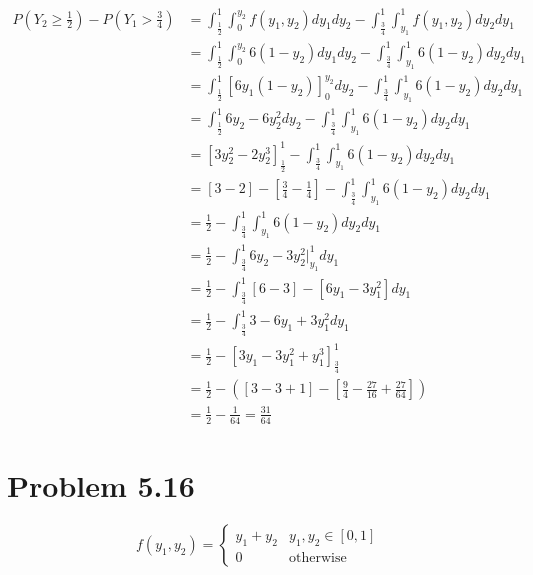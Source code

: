 \documentclass{article}
\theoremstyle{definition}
\begin{document}
        \begin{align*}
            P(Y_2 \geqslant \frac{1}{2}) - P(Y_1 > \frac{3}{4})
            &= \int_\frac{1}{2}^1 \int_0^{y_2} f(y_1,y_2) dy_1 dy_2 - 
               \int_\frac{3}{4}^1 \int_{y_1}^1 f(y_1,y_2) dy_2 dy_1 \\
            &= \int_\frac{1}{2}^1 \int_0^{y_2} 6(1 - y_2) dy_1 dy_2 - 
               \int_\frac{3}{4}^1 \int_{y_1}^1 6(1 - y_2) dy_2 dy_1 \\
            &= \int_{\frac{1}{2}}^1 \left[6y_1(1 - y_2)\right]_0^{y_2} dy_2 -
               \int_{\frac{3}{4}}^1 \int_{y_1}^1 6(1 - y_2) dy_2 dy_1 \\
            &= \int_\frac{1}{2}^1 6y_2 - 6y_2^2 dy_2 - 
               \int_{\frac{3}{4}}^1 \int_{y_1}^1 6(1 - y_2) dy_2 dy_1 \\
            &= \left[ 3y_2^2 - 2y_2^3 \right]_\frac{1}{2}^1 - 
               \int_{\frac{3}{4}}^1 \int_{y_1}^1 6(1 - y_2) dy_2 dy_1 \\
            &= [3 - 2] - [\frac{3}{4} - \frac{1}{4}] - 
               \int_{\frac{3}{4}}^1 \int_{y_1}^1 6(1 - y_2) dy_2 dy_1 \\
            &= \frac{1}{2} - \int_{\frac{3}{4}}^1 \int_{y_1}^1 6(1 - y_2) dy_2 dy_1 \\
            &= \frac{1}{2} - \int_{\frac{3}{4}}^1 6y_2 - 3y_2^2 \bigg|_{y_1}^1 dy_1\\
            &= \frac{1}{2} - \int_{\frac{3}{4}}^1 [6 - 3] - [6y_1 - 3y_1^2] dy_1\\
            &= \frac{1}{2} - \int_{\frac{3}{4}}^1 3 - 6y_1 + 3y_1^2 dy_1 \\
            &= \frac{1}{2} - \left[3y_1 - 3y_1^2 + y_1^3 \right]_\frac{3}{4}^1\\
            &= \frac{1}{2} - \left([3 - 3 + 1] - \left[\frac{9}{4} - \frac{27}{16} + \frac{27}{64}\right]\right)\\
            &= \frac{1}{2} - \frac{1}{64} = \frac{31}{64}
        \end{align*}

\section*{Problem 5.16}
    \[
        f(y_1,y_2) =
        \begin{cases}
            y_1 + y_2 & y_1,y_2 \in [0,1]\\
            0 & \text{otherwise}
        \end{cases}
    \]
\end{document}
